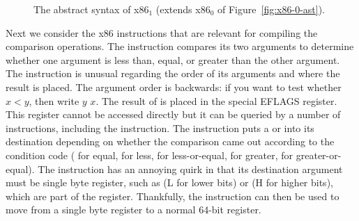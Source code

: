 \documentclass[11pt]{book}
\newcommand{\gray}[1]{{\color{gray} #1}}
\begin{document}
\begin{figure}[tp]
\fbox{
\begin{minipage}{0.96\textwidth}
\small    
\[
\begin{array}{lcl}
\itm{bytereg} &::=& \key{ah} \mid \key{al} \mid \key{bh} \mid \key{bl}
    \mid \key{ch} \mid \key{cl} \mid \key{dh} \mid \key{dl} \\
\Arg &::=&  \gray{\IMM{\Int} \mid \REG{\Reg} \mid \DEREF{\Reg}{\Int}} 
     \mid \BYTEREG{\itm{bytereg}} \\
\itm{cc} & ::= & \key{e} \mid \key{l} \mid \key{le} \mid \key{g} \mid \key{ge} \\
\Instr &::=& \gray{ \BININSTR{\code{'addq}}{\Arg}{\Arg} 
       \mid \BININSTR{\code{'subq}}{\Arg}{\Arg} } \\
       &\mid& \gray{ \BININSTR{\code{'movq}}{\Arg}{\Arg} 
       \mid \UNIINSTR{\code{'negq}}{\Arg} } \\
       &\mid& \gray{ \CALLQ{\itm{label}} \mid \RETQ{} 
       \mid \PUSHQ{\Arg} \mid \POPQ{\Arg} \mid \JMP{\itm{label}} } \\
       &\mid& \BININSTR{\code{'xorq}}{\Arg}{\Arg}
       \mid \BININSTR{\code{'cmpq}}{\Arg}{\Arg}\\
       &\mid& \BININSTR{\code{'set}}{\itm{cc}}{\Arg} 
       \mid \BININSTR{\code{'movzbq}}{\Arg}{\Arg}\\
       &\mid&  \JMPIF{\itm{cc}}{\itm{label}} \\
\Block &::= & \gray{\BLOCK{\itm{info}}{\Instr\ldots}} \\
x86_1 &::= & \gray{\PROGRAM{\itm{info}}{\CFG{\key{(}\itm{label} \,\key{.}\, \Block \key{)}\ldots}}}
\end{array}
\]
\end{minipage}
}
\caption{The abstract syntax of x86$_1$ (extends x86$_0$ of Figure~\ref{fig:x86-0-ast}).}
\label{fig:x86-1}
\end{figure}

Next we consider the x86 instructions that are relevant for compiling
the comparison operations. The  instruction compares its two
arguments to determine whether one argument is less than, equal, or
greater than the other argument. The  instruction is unusual
regarding the order of its arguments and where the result is
placed. The argument order is backwards: if you want to test whether
$x < y$, then write  $y$\code{,} $x$. The result of
 is placed in the special EFLAGS register. This register
cannot be accessed directly but it can be queried by a number of
instructions, including the  instruction. The 
instruction puts a  or  into its destination depending
on whether the comparison came out according to the condition code
 ( for equal,  for less,  for
less-or-equal,  for greater,  for greater-or-equal).
The  instruction has an annoying quirk in that its
destination argument must be single byte register, such as 
(L for lower bits) or  (H for higher bits), which are part of
the  register.  Thankfully, the  instruction can
then be used to move from a single byte register to a normal 64-bit
register.
\end{document}
